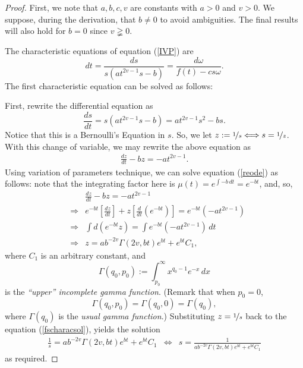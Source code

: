 \documentclass[preprint, 12pt]{elsarticle}
\numberwithin{equation}{section}
\theoremstyle{plain}
\theoremstyle{remark}
\newcommand{\assign}{:=}
\newcommand{\nocomma}{}
\begin{document}
\begin{proof}
First, we note that $a, b, c, v$ are constants with $a>0$ and $v > 0$. We suppose, during the derivation, that $b \neq 0$ to avoid ambiguities. The final results will also hold for $b = 0$ since $v \gneqq 0$.
  
The characteristic equations of equation (\ref{IVP}) are
\[ d t = \frac{d s}{s (a t^{2 v - 1} s - b)} = \frac{d \omega}{f (t) - c s \omega} . \]
The first characteristic equation can be solved as follows:

First, rewrite the differential equation as
\[ \frac{d s}{d t} = s (a t^{2 v - 1} s - b) = a t^{2 v - 1} s^2 - b s. \]
Notice that this is a Bernoulli's Equation in $s$. So, we let $\displaystyle{z \assign \nicefrac{1}{s} \Longleftrightarrow s = \nicefrac{1}{z}}$. With this change of variable, we may rewrite the above equation as
\begin{eqnarray}
\frac{d z}{d t} - b z = - a t^{2 v - 1}. \label{reode}
\end{eqnarray}
Using variation of parameters technique, we can solve equation (\ref{reode}) as follows: note that the integrating factor here is $\displaystyle{{\mu} (t) = e^{\int{- b\, d t}} = e^{- b t}}$, and, so,
\begin{eqnarray}
& & \frac{d z}{d t} - b z = - a t^{2 v - 1} \nonumber \\
& \Longrightarrow & e^{- b t}  \left[ \frac{d z}{d t} \right] + z \left[ \frac{d}{d t} (e^{- b t}) \right] = e^{- b t}  (- a t^{2 v - 1}) \nonumber\\
& \Longrightarrow & \int d (e^{- b t} z) = \int e^{- b t}  (- a t^{2 v - 1})\, d t \nonumber\\
& \Longrightarrow & z = a b^{- 2 v} \Gamma (2 v \nocomma, b t) e^{b t} + e^{bt} C_1 \label{fscharacsol}, 
\end{eqnarray}
where $C_1$ is an arbitrary constant, and
\[ \Gamma (q_0, p_0) \assign \int_{p_0}^{\infty} x^{q_0 - 1} e^{- x}\, d x\]
is the \textit{``upper'' incomplete gamma function}. (Remark that when $p_0 = 0$, 
\[\Gamma (q_0, p_0) = \Gamma (q_0, 0) = \Gamma (q_0),\] 
where $\Gamma (q_0)$ is the \textit{usual gamma function}.) Substituting $\displaystyle{z = \nicefrac{1}{s}}$ back to the equation (\ref{fscharacsol}), yields the solution
\begin{eqnarray*}
\frac{1}{s} = a b^{- 2 v} \Gamma (2 v \nocomma, b t) e^{b t} + e^{bt} C_1 & \Longleftrightarrow & s = \frac{1}{a b^{- 2 v} \Gamma (2 v \nocomma, b t) e^{b t} + e^{bt} C_1}
\end{eqnarray*}
as required.
  

\end{proof}
\end{document}
